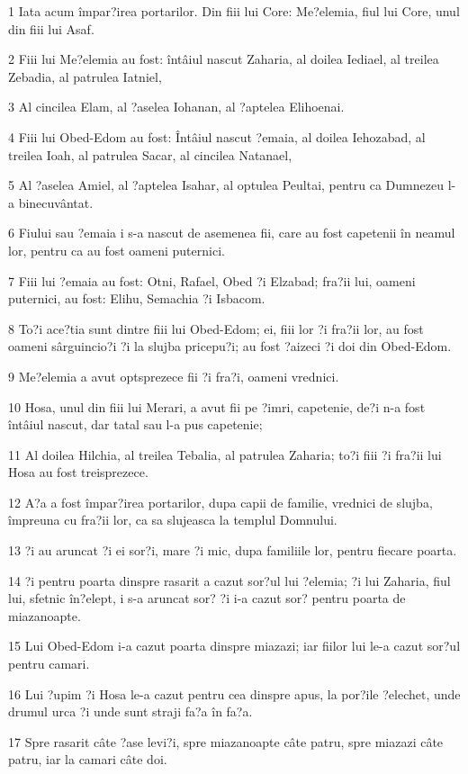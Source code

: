 \par 1 Iata acum împar?irea portarilor. Din fiii lui Core: Me?elemia, fiul lui Core, unul din fiii lui Asaf.
\par 2 Fiii lui Me?elemia au fost: întâiul nascut Zaharia, al doilea Iediael, al treilea Zebadia, al patrulea Iatniel,
\par 3 Al cincilea Elam, al ?aselea Iohanan, al ?aptelea Elihoenai.
\par 4 Fiii lui Obed-Edom au fost: Întâiul nascut ?emaia, al doilea Iehozabad, al treilea Ioah, al patrulea Sacar, al cincilea Natanael,
\par 5 Al ?aselea Amiel, al ?aptelea Isahar, al optulea Peultai, pentru ca Dumnezeu l-a binecuvântat.
\par 6 Fiului sau ?emaia i s-a nascut de asemenea fii, care au fost capetenii în neamul lor, pentru ca au fost oameni puternici.
\par 7 Fiii lui ?emaia au fost: Otni, Rafael, Obed ?i Elzabad; fra?ii lui, oameni puternici, au fost: Elihu, Semachia ?i Isbacom.
\par 8 To?i ace?tia sunt dintre fiii lui Obed-Edom; ei, fiii lor ?i fra?ii lor, au fost oameni sârguincio?i ?i la slujba pricepu?i; au fost ?aizeci ?i doi din Obed-Edom.
\par 9 Me?elemia a avut optsprezece fii ?i fra?i, oameni vrednici.
\par 10 Hosa, unul din fiii lui Merari, a avut fii pe ?imri, capetenie, de?i n-a fost întâiul nascut, dar tatal sau l-a pus capetenie;
\par 11 Al doilea Hilchia, al treilea Tebalia, al patrulea Zaharia; to?i fiii ?i fra?ii lui Hosa au fost treisprezece.
\par 12 A?a a fost împar?irea portarilor, dupa capii de familie, vrednici de slujba, împreuna cu fra?ii lor, ca sa slujeasca la templul Domnului.
\par 13 ?i au aruncat ?i ei sor?i, mare ?i mic, dupa familiile lor, pentru fiecare poarta.
\par 14 ?i pentru poarta dinspre rasarit a cazut sor?ul lui ?elemia; ?i lui Zaharia, fiul lui, sfetnic în?elept, i s-a aruncat sor? ?i i-a cazut sor? pentru poarta de miazanoapte.
\par 15 Lui Obed-Edom i-a cazut poarta dinspre miazazi; iar fiilor lui le-a cazut sor?ul pentru camari.
\par 16 Lui ?upim ?i Hosa le-a cazut pentru cea dinspre apus, la por?ile ?elechet, unde drumul urca ?i unde sunt straji fa?a în fa?a.
\par 17 Spre rasarit câte ?ase levi?i, spre miazanoapte câte patru, spre miazazi câte patru, iar la camari câte doi.
